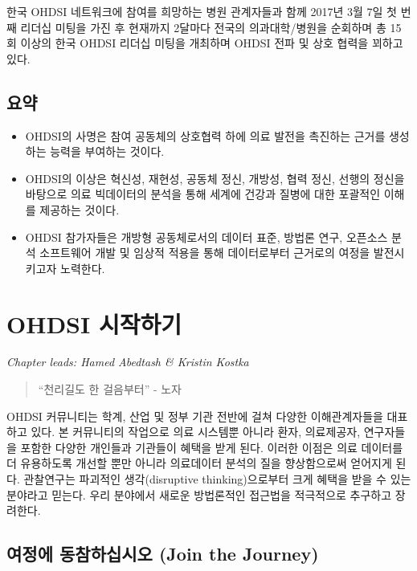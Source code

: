 \documentclass[11pt]{book}
\theoremstyle{definition}
\theoremstyle{definition}
\theoremstyle{definition}
\theoremstyle{remark}
\let\BeginKnitrBlock\begin \let\EndKnitrBlock\end
\begin{document}
한국 OHDSI 네트워크에 참여를 희망하는 병원 관계자들과 함께 2017년 3월
7일 첫 번째 리더십 미팅을 가진 후 현재까지 2달마다 전국의
의과대학/병원을 순회하며 총 15회 이상의 한국 OHDSI 리더십 미팅을
개최하며 OHDSI 전파 및 상호 협력을 꾀하고 있다.

\section{요약}

\BeginKnitrBlock{rmdsummary}
\begin{itemize}
\item
  OHDSI의 사명은 참여 공동체의 상호협력 하에 의료 발전을 촉진하는 근거를
  생성하는 능력을 부여하는 것이다.
\item
  OHDSI의 이상은 혁신성, 재현성, 공동체 정신, 개방성, 협력 정신, 선행의
  정신을 바탕으로 의료 빅데이터의 분석을 통해 세계에 건강과 질병에 대한
  포괄적인 이해를 제공하는 것이다.
\item
  OHDSI 참가자들은 개방형 공동체로서의 데이터 표준, 방법론 연구,
  오픈소스 분석 소프트웨어 개발 및 임상적 적용을 통해 데이터로부터
  근거로의 여정을 발전시키고자 노력한다.
\end{itemize}
\EndKnitrBlock{rmdsummary}

\chapter{OHDSI 시작하기}\label{WhereToBegin}

\emph{Chapter leads: Hamed Abedtash \& Kristin Kostka}

\begin{quote}
``천리길도 한 걸음부터'' - 노자
\end{quote}

OHDSI 커뮤니티는 학계, 산업 및 정부 기관 전반에 걸쳐 다양한
이해관계자들을 대표하고 있다. 본 커뮤니티의 작업으로 의료 시스템뿐
아니라 환자, 의료제공자, 연구자들을 포함한 다양한 개인들과 기관들이
혜택을 받게 된다. 이러한 이점은 의료 데이터를 더 유용하도록 개선할 뿐만
아니라 의료데이터 분석의 질을 향상함으로써 얻어지게 된다. 관찰연구는
파괴적인 생각(disruptive thinking)으로부터 크게 혜택을 받을 수 있는
분야라고 믿는다. 우리 분야에서 새로운 방법론적인 접근법을 적극적으로
추구하고 장려한다. 

\section{여정에 동참하십시오 (Join the
Journey)}\label{--join-the-journey}
\end{document}
